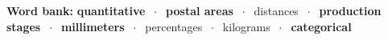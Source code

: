 \documentclass[11pt]{article}
\begin{document}
\begin{wordbankbox}\raggedright
\textbf{Word bank:} \textbf{quantitative} \ensuremath{\;\cdot\;} \textbf{postal areas} \ensuremath{\;\cdot\;} distances \ensuremath{\;\cdot\;} \textbf{production stages} \ensuremath{\;\cdot\;} \textbf{millimeters} \ensuremath{\;\cdot\;} percentages \ensuremath{\;\cdot\;} kilograms \ensuremath{\;\cdot\;} \textbf{categorical}
\par{}
\end{wordbankbox}
\end{document}
